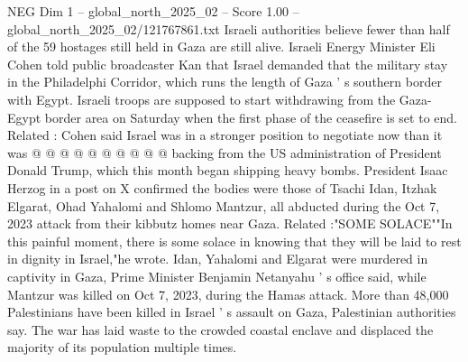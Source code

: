 \begin{textsample}{NEG Dim 1 – global\_north\_2025\_02 – Score 1.00 – global\_north\_2025\_02/121767861.txt}
Israeli authorities believe fewer than half of the 59 hostages still held in Gaza are still alive.
Israeli Energy Minister Eli Cohen told public broadcaster Kan that Israel demanded that the military stay in the Philadelphi Corridor, which runs the length of Gaza ' s southern border with Egypt.
Israeli troops are supposed to start withdrawing from the Gaza-Egypt border area on Saturday when the first phase of the ceasefire is set to end.
Related : Cohen said Israel was in a stronger position to negotiate now than it was @ @ @ @ @ @ @ @ @ @ backing from the US administration of President Donald Trump, which this month began shipping heavy bombs.
President Isaac Herzog in a post on X confirmed the bodies were those of Tsachi Idan, Itzhak Elgarat, Ohad Yahalomi and Shlomo Mantzur, all abducted during the Oct 7, 2023 attack from their kibbutz homes near Gaza.
Related :"SOME SOLACE""In this painful moment, there is some solace in knowing that they will be laid to rest in dignity in Israel,"he wrote.
Idan, Yahalomi and Elgarat were murdered in captivity in Gaza, Prime Minister Benjamin Netanyahu ' s office said, while Mantzur was killed on Oct 7, 2023, during the Hamas attack.
More than 48,000 Palestinians have been killed in Israel ' s assault on Gaza, Palestinian authorities say.
The war has laid waste to the crowded coastal enclave and displaced the majority of its population multiple times.

\end{textsample}
